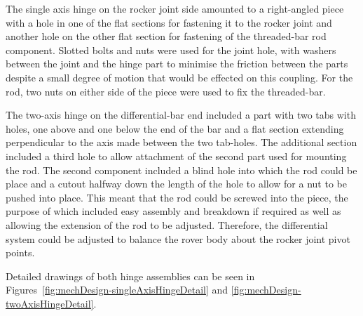         The single axis hinge on the rocker joint side amounted to a right-angled piece with a hole in one of the flat sections for fastening it to the rocker joint and another hole on the other flat section for fastening of the threaded-bar rod component. Slotted bolts and nuts were used for the joint hole, with washers between the joint and the hinge part to minimise the friction between the parts despite a small degree of motion that would be effected on this coupling. For the rod, two nuts on either side of the piece were used to fix the threaded-bar.
        
        The two-axis hinge on the differential-bar end included a part with two tabs with holes, one above and one below the end of the bar and a flat section extending perpendicular to the axis made between the two tab-holes. The additional section included a third hole to allow attachment of the second part used for mounting the rod. The second component included a blind hole into which the rod could be place and a cutout halfway down the length of the hole to allow for a nut to be pushed into place. This meant that the rod could be screwed into the piece, the purpose of which included easy assembly and breakdown if required as well as allowing the extension of the rod to be adjusted. Therefore, the differential system could be adjusted to balance the rover body about the rocker joint pivot points.
        
        Detailed drawings of both hinge assemblies can be seen in Figures~\ref{fig:mechDesign-singleAxisHingeDetail} and \ref{fig:mechDesign-twoAxisHingeDetail}.
        
